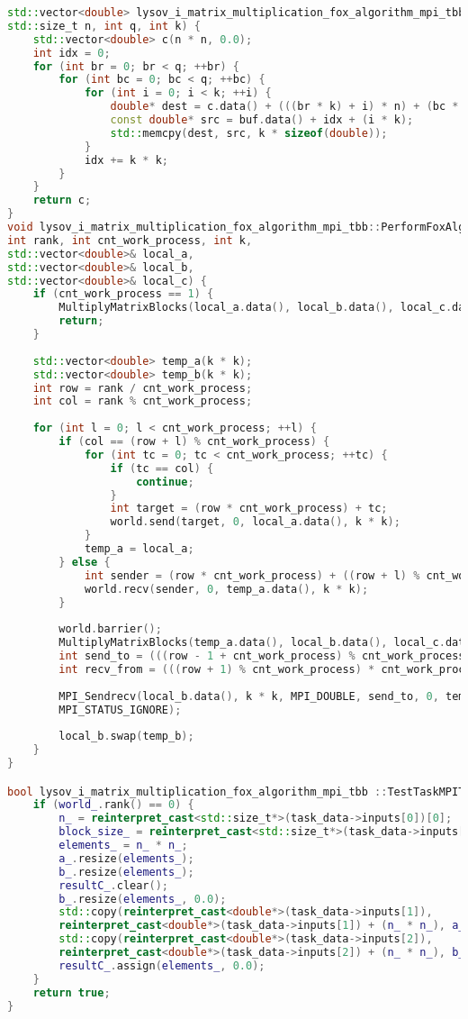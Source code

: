 \documentclass[12pt,a4paper]{extarticle}
\begin{document}
\begin{lstlisting}[language=C++]
std::vector<double> lysov_i_matrix_multiplication_fox_algorithm_mpi_tbb::GatherMatrix(const std::vector<double>& buf,
std::size_t n, int q, int k) {
	std::vector<double> c(n * n, 0.0);
	int idx = 0;
	for (int br = 0; br < q; ++br) {
		for (int bc = 0; bc < q; ++bc) {
			for (int i = 0; i < k; ++i) {
				double* dest = c.data() + (((br * k) + i) * n) + (bc * k);
				const double* src = buf.data() + idx + (i * k);
				std::memcpy(dest, src, k * sizeof(double));
			}
			idx += k * k;
		}
	}
	return c;
}
void lysov_i_matrix_multiplication_fox_algorithm_mpi_tbb::PerformFoxAlgorithmStep(boost::mpi::communicator& world,
int rank, int cnt_work_process, int k,
std::vector<double>& local_a,
std::vector<double>& local_b,
std::vector<double>& local_c) {
	if (cnt_work_process == 1) {
		MultiplyMatrixBlocks(local_a.data(), local_b.data(), local_c.data(), k);
		return;
	}
	
	std::vector<double> temp_a(k * k);
	std::vector<double> temp_b(k * k);
	int row = rank / cnt_work_process;
	int col = rank % cnt_work_process;
	
	for (int l = 0; l < cnt_work_process; ++l) {
		if (col == (row + l) % cnt_work_process) {
			for (int tc = 0; tc < cnt_work_process; ++tc) {
				if (tc == col) {
					continue;
				}
				int target = (row * cnt_work_process) + tc;
				world.send(target, 0, local_a.data(), k * k);
			}
			temp_a = local_a;
		} else {
			int sender = (row * cnt_work_process) + ((row + l) % cnt_work_process);
			world.recv(sender, 0, temp_a.data(), k * k);
		}
		
		world.barrier();
		MultiplyMatrixBlocks(temp_a.data(), local_b.data(), local_c.data(), k);
		int send_to = (((row - 1 + cnt_work_process) % cnt_work_process) * cnt_work_process) + col;
		int recv_from = (((row + 1) % cnt_work_process) * cnt_work_process) + col;
		
		MPI_Sendrecv(local_b.data(), k * k, MPI_DOUBLE, send_to, 0, temp_b.data(), k * k, MPI_DOUBLE, recv_from, 0, world,
		MPI_STATUS_IGNORE);
		
		local_b.swap(temp_b);
	}
}

bool lysov_i_matrix_multiplication_fox_algorithm_mpi_tbb ::TestTaskMPITBB::PreProcessingImpl() {
	if (world_.rank() == 0) {
		n_ = reinterpret_cast<std::size_t*>(task_data->inputs[0])[0];
		block_size_ = reinterpret_cast<std::size_t*>(task_data->inputs[3])[0];
		elements_ = n_ * n_;
		a_.resize(elements_);
		b_.resize(elements_);
		resultC_.clear();
		b_.resize(elements_, 0.0);
		std::copy(reinterpret_cast<double*>(task_data->inputs[1]),
		reinterpret_cast<double*>(task_data->inputs[1]) + (n_ * n_), a_.begin());
		std::copy(reinterpret_cast<double*>(task_data->inputs[2]),
		reinterpret_cast<double*>(task_data->inputs[2]) + (n_ * n_), b_.begin());
		resultC_.assign(elements_, 0.0);
	}
	return true;
}


\end{lstlisting}
\end{document}
